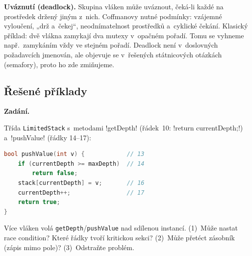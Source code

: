 \begin{poznamka}
\textbf{Uváznutí (deadlock).} Skupina vláken může uváznout, čeká-li každé na prostředek držený jiným z~nich. Coffmanovy nutné podmínky: vzájemné vyloučení, „drž a~čekej``, neodnímatelnost prostředků a~cyklické čekání. Klasický příklad: dvě vlákna zamykají dva mutexy v~opačném pořadí. Tomu se vyhneme např.\ zamykáním vždy ve stejném pořadí. Deadlock není v~doslovných požadavcích jmenován, ale objevuje se v~řešených státnicových otázkách (semafory), proto ho zde zmiňujeme.
\end{poznamka}

\subsection{Řešené příklady}

\begin{priklad}
\par
\textbf{Zadání.}\par
Třída \texttt{LimitedStack} s~metodami \cd!getDepth! (řádek~10: \cd!return currentDepth;!) a~\cd!pushValue! (řádky 14--17):
\begin{lstlisting}[language=C++]
bool pushValue(int v) {            // 13
    if (currentDepth >= maxDepth)  // 14
        return false;
    stack[currentDepth] = v;       // 16
    currentDepth++;                // 17
    return true;
}
\end{lstlisting}
Více vláken volá \texttt{getDepth}/\texttt{pushValue} nad sdílenou instancí. (1)~Může nastat race condition? Které řádky tvoří kritickou sekci? (2)~Může přetéct zásobník (zápis mimo pole)? (3)~Odstraňte problém.


\end{priklad}
